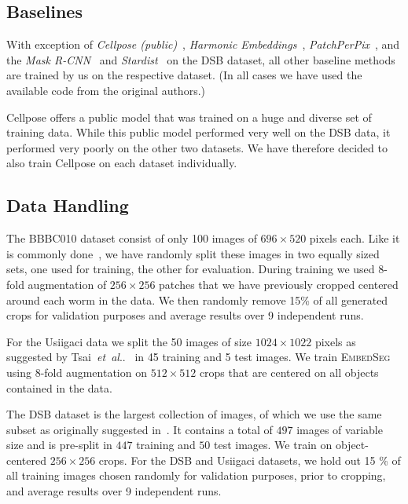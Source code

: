 \documentclass{midl}
\makeatletter
\newcommand{\EmbedSeg}{\mbox{\textsc{EmbedSeg}}\xspace}
\newcommand{\miniheadline}[1]{\noindent\textbf{#1.}}
\DeclareRobustCommand\onedot{\futurelet\@let@token\@onedot}
\def\@onedot{\ifx\@let@token.\else.\null\fi\xspace}
\def\etal{\emph{et~al}\onedot}
\makeatother
\begin{document}
\subsection{Baselines}
With exception of \textit{Cellpose (public)}~\cite{stringer2020}, \textit{Harmonic Embeddings}~\cite{kulikov2020}, \textit{PatchPerPix}~\cite{hirsch2020}, and the \textit{Mask R-CNN}~\cite{he2017} and \textit{Stardist}~\cite{schmidt2018} on the  DSB dataset, all other baseline methods are trained by us on the respective dataset.
(In all cases we have used the available code from the original authors.)

Cellpose offers a public model that was trained on a huge and diverse set of training data. 
While this public model performed very well on the DSB data, it performed very poorly on the other two datasets.
We have therefore decided to also train Cellpose on each dataset individually.

\subsection{Data Handling}
The BBBC010 dataset consist of only 100 images of $696\times 520$ pixels each.
Like it is commonly done~\cite{novotny2018,hirsch2020,yurchenko2017}, we have randomly split these images in two equally sized sets, one used for training, the other for evaluation.
During training we used 8-fold augmentation of $256\times 256$ patches that we have previously cropped centered around each worm in the data.
We then randomly remove 15\% of all generated crops for validation purposes and average results over 9 independent runs.

For the Usiigaci data we split the 50 images of size $1024\times 1022$ pixels as suggested by Tsai~\etal~\cite{tsai2019} in 45 training and 5 test images.
We train \EmbedSeg using 8-fold augmentation on $512\times 512$ crops that are centered on all objects contained in the data.

The DSB dataset is the largest collection of images, of which we use the same subset as originally suggested in~\cite{schmidt2018}.
It contains a total of $497$ images of variable size and is pre-split in $447$ training and $50$ test images. 
We train on object-centered $256\times 256$ crops. 
For the DSB and Usiigaci datasets, we hold out 15 \% of all training images chosen randomly for validation purposes, prior to cropping, and average results over 9 independent runs.
\end{document}
